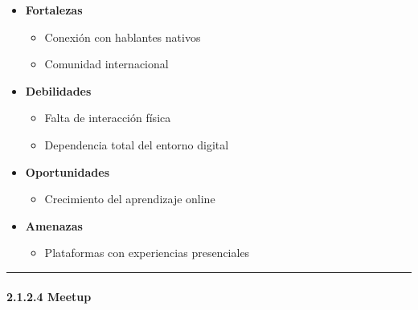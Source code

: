 \begin{itemize}
\tightlist
\item
  \textbf{Fortalezas}

  \begin{itemize}
  \tightlist
  \item
    Conexión con hablantes nativos
  \item
    Comunidad internacional
  \end{itemize}
\item
  \textbf{Debilidades}

  \begin{itemize}
  \tightlist
  \item
    Falta de interacción física
  \item
    Dependencia total del entorno digital
  \end{itemize}
\item
  \textbf{Oportunidades}

  \begin{itemize}
  \tightlist
  \item
    Crecimiento del aprendizaje online
  \end{itemize}
\item
  \textbf{Amenazas}

  \begin{itemize}
  \tightlist
  \item
    Plataformas con experiencias presenciales
  \end{itemize}
\end{itemize}

\begin{center}\rule{0.5\linewidth}{0.5pt}\end{center}

\paragraph{2.1.2.4
Meetup}\label{report__20-cap2-requirements-analysis.md__meetup}

